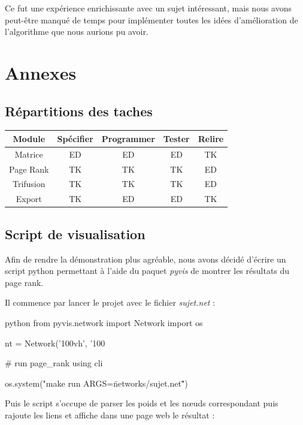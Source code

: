 \documentclass{NewTeX}
\begin{document}
Ce fut une expérience enrichissante avec un sujet intéressant, mais nous avons peut-être manqué de temps pour implémenter toutes les idées d'amélioration de l'algorithme que nous aurions pu avoir.



\section{Annexes}

\subsection{Répartitions des taches}
\begin{table}[H]
    \centering
    \begin{tabular}{|c||c|c|c|c|}
        \hline
        Module & Spécifier & Programmer & Tester & Relire \\
        \hline
        \hline
        Matrice & ED & ED & ED & TK \\
        \hline
        Page Rank & TK & TK & TK & ED \\
        \hline
        Trifusion & TK & TK & TK & ED \\
        \hline
        Export & TK & ED & ED & TK \\
        \hline
     \end{tabular} 
\end{table}

\subsection{Script de visualisation}

Afin de rendre la démonstration plus agréable, nous avons décidé d'écrire un script python permettant à l'aide du paquet \textit{pyvis} de montrer les résultats du page rank.

Il commence par lancer le projet avec le fichier \textit{sujet.net} : 

\begin{code}{python}
from pyvis.network import Network
import os

nt = Network('100vh', '100%

# run page_rank using cli

os.system("make run ARGS=\"networks/sujet.net\"")
\end{code}

Puis le script s'occupe de parser les poids et les nœuds correspondant puis rajoute les liens et affiche dans une page web le résultat : 
\end{document}
